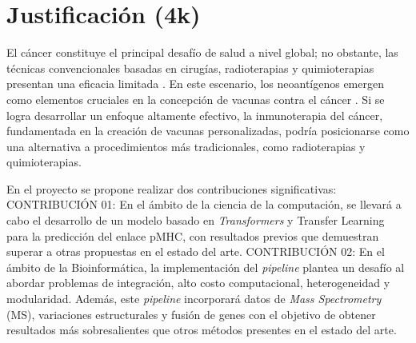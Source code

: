 \documentclass[a4paper,11pt]{article}
\begin{document}
\section{Justificación (4k)}



El cáncer constituye el principal desafío de salud a nivel global; no obstante, las técnicas convencionales basadas en cirugías, radioterapias y quimioterapias presentan una eficacia limitada \cite{peng2019neoantigen}. En este escenario, los neoantígenos emergen como elementos cruciales en la concepción de vacunas contra el cáncer \cite{borden2022cancer,chen2021challenges,gopanenko2020main}. Si se logra desarrollar un enfoque altamente efectivo, la inmunoterapia del cáncer, fundamentada en la creación de vacunas personalizadas, podría posicionarse como una alternativa a procedimientos más tradicionales, como radioterapias y quimioterapias.

En el proyecto se propone realizar dos contribuciones significativas: CONTRIBUCIÓN 01: En el ámbito de la ciencia de la computación, se llevará a cabo el desarrollo de un modelo basado en \textit{Transformers} y Transfer Learning para la predicción del enlace pMHC, con resultados previos que demuestran superar a otras propuestas en el estado del arte. CONTRIBUCIÓN 02: En el ámbito de la Bioinformática, la implementación del \textit{pipeline} plantea un desafío al abordar problemas de integración, alto costo computacional, heterogeneidad y modularidad. Además, este \textit{pipeline} incorporará datos de \textit{Mass Spectrometry} (MS), variaciones estructurales y fusión de genes con el objetivo de obtener resultados más sobresalientes que otros métodos presentes en el estado del arte.
\end{document}
